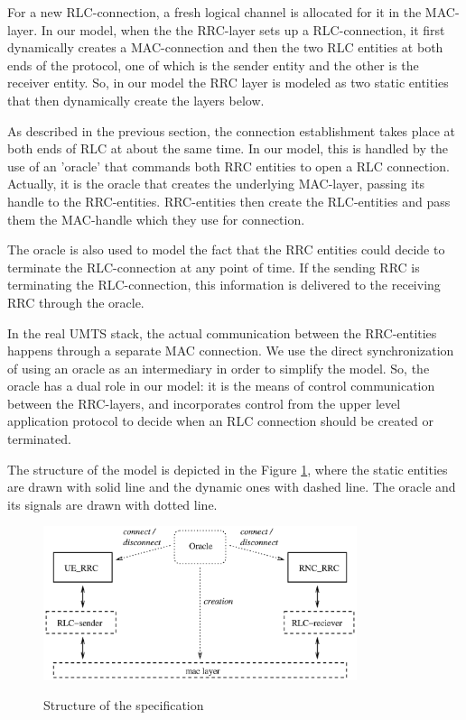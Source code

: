 \documentclass{entcs} \usepackage{entcsmacro}
\begin{document}
For a new RLC-connection, a fresh logical channel is allocated
for it in the MAC-layer. In our model, when the the RRC-layer sets up a
RLC-connection, it first dynamically creates a MAC-connection and then the
two RLC entities at both ends of the protocol, one of which is the sender
entity and the other is the receiver entity. So, in our model the RRC layer
is modeled as two static entities that then dynamically create the layers
below.

As described in the previous section, the connection establishment
takes place at both ends of RLC at about the same time. In our model,
this is handled by the use of an 'oracle' that commands both RRC
entities to open a RLC connection. Actually, it is the oracle that
creates the underlying MAC-layer, passing its handle to the
RRC-entities.  RRC-entities then create the RLC-entities and pass them
the MAC-handle which they use for connection.

The oracle is also used to model the fact that the RRC entities could
decide to terminate the RLC-connection at any point of time.  If the
sending RRC is terminating the RLC-connection, this information is
delivered to the receiving RRC through the oracle.

In the real UMTS stack, the actual communication between the
RRC-entities happens through a separate MAC connection. We use the
direct synchronization of using an oracle as an intermediary in order
to simplify the model.  So, the oracle has a dual role in our model:
it is the means of control communication between the RRC-layers, and
incorporates control from the upper level application protocol to 
decide when an RLC connection should be created or terminated.

The structure of the model is depicted in the Figure \ref{arch}, where 
the static entities are drawn with solid line and the dynamic ones with
dashed line. The oracle and its signals are drawn with dotted line.


\begin{figure}
\begin{center}
  \includegraphics[height=4.5cm]{arch.eps}\\
  \caption{Structure of the specification}
  \label{arch}
\end{center}
\end{figure}
\end{document}
